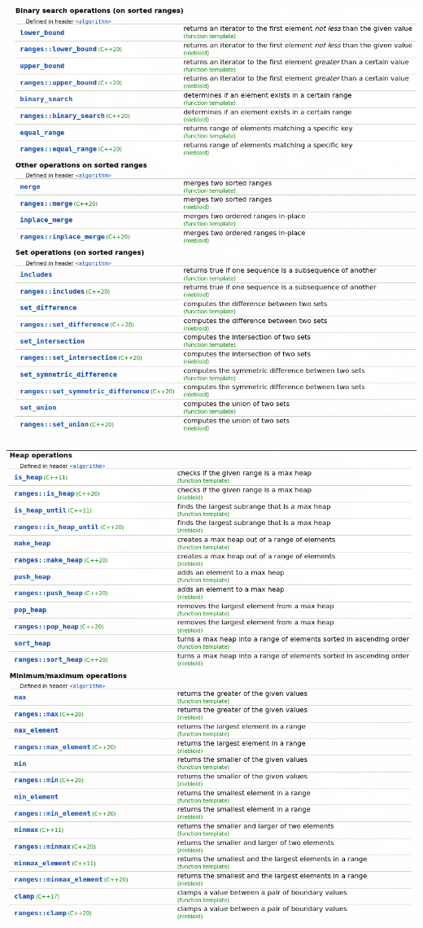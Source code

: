 \documentclass[11pt,twoside,twocolumn,landscape]{article}
\begin{document}
\begin{center}
\includegraphics[width=.9\linewidth]{img/algorithm_5.png}
\end{center}
\begin{center}
\includegraphics[width=.9\linewidth]{img/algorithm_6.png}
\end{center}
\end{document}

